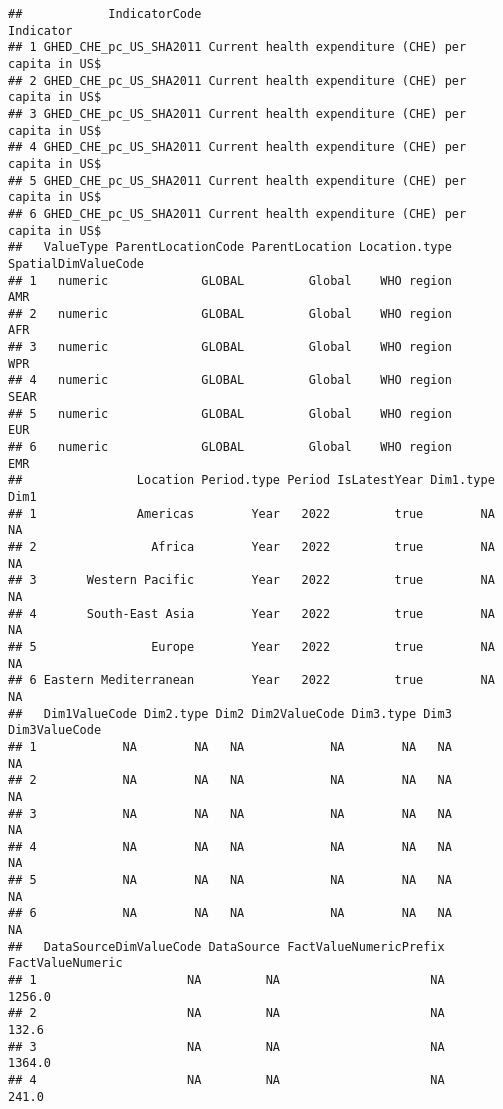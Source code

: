 \documentclass[
]{article}
\begin{document}
\begin{verbatim}
##            IndicatorCode                                          Indicator
## 1 GHED_CHE_pc_US_SHA2011 Current health expenditure (CHE) per capita in US$
## 2 GHED_CHE_pc_US_SHA2011 Current health expenditure (CHE) per capita in US$
## 3 GHED_CHE_pc_US_SHA2011 Current health expenditure (CHE) per capita in US$
## 4 GHED_CHE_pc_US_SHA2011 Current health expenditure (CHE) per capita in US$
## 5 GHED_CHE_pc_US_SHA2011 Current health expenditure (CHE) per capita in US$
## 6 GHED_CHE_pc_US_SHA2011 Current health expenditure (CHE) per capita in US$
##   ValueType ParentLocationCode ParentLocation Location.type SpatialDimValueCode
## 1   numeric             GLOBAL         Global    WHO region                 AMR
## 2   numeric             GLOBAL         Global    WHO region                 AFR
## 3   numeric             GLOBAL         Global    WHO region                 WPR
## 4   numeric             GLOBAL         Global    WHO region                SEAR
## 5   numeric             GLOBAL         Global    WHO region                 EUR
## 6   numeric             GLOBAL         Global    WHO region                 EMR
##                Location Period.type Period IsLatestYear Dim1.type Dim1
## 1              Americas        Year   2022         true        NA   NA
## 2                Africa        Year   2022         true        NA   NA
## 3       Western Pacific        Year   2022         true        NA   NA
## 4       South-East Asia        Year   2022         true        NA   NA
## 5                Europe        Year   2022         true        NA   NA
## 6 Eastern Mediterranean        Year   2022         true        NA   NA
##   Dim1ValueCode Dim2.type Dim2 Dim2ValueCode Dim3.type Dim3 Dim3ValueCode
## 1            NA        NA   NA            NA        NA   NA            NA
## 2            NA        NA   NA            NA        NA   NA            NA
## 3            NA        NA   NA            NA        NA   NA            NA
## 4            NA        NA   NA            NA        NA   NA            NA
## 5            NA        NA   NA            NA        NA   NA            NA
## 6            NA        NA   NA            NA        NA   NA            NA
##   DataSourceDimValueCode DataSource FactValueNumericPrefix FactValueNumeric
## 1                     NA         NA                     NA           1256.0
## 2                     NA         NA                     NA            132.6
## 3                     NA         NA                     NA           1364.0
## 4                     NA         NA                     NA            241.0

\end{verbatim}
\end{document}
